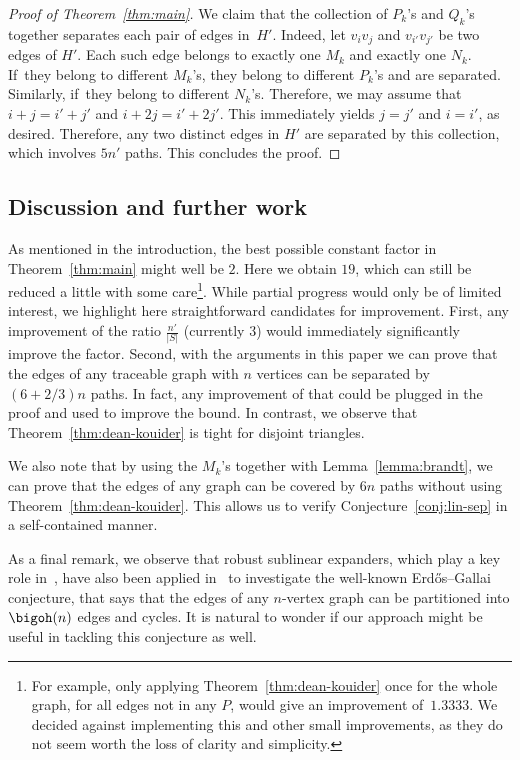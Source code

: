 \begin{proof}[Proof of Theorem~\ref{thm:main}]
We claim that the collection of $P_k$'s and $Q_k$'s
together separates each pair of edges in~\(H'\).
Indeed, let $v_iv_j$ and $v_{i'}v_{j'}$ be two edges of \(H'\).
Each such edge belongs to exactly one $M_k$ and exactly one $N_k$.
If~they belong to different \(M_k\)'s, they belong to different $P_k$'s and are separated.
Similarly, if~they belong to different $N_k$'s. Therefore, we may assume that $i+j=i'+j'$ and $i+2 j=i'+2 j'$. This immediately yields $j=j'$ and $i=i'$,
as desired. Therefore, any two distinct edges in $H'$ are separated by this collection, which involves $5n'$ paths.
This concludes the proof.
\end{proof}

\subsection*{Discussion and further work}
As mentioned in the introduction, the best possible constant factor in Theorem~\ref{thm:main} might well be $2$. Here we obtain $19$, which can still be reduced a little with some care\footnote{For example, only applying Theorem~\ref{thm:dean-kouider} once for the whole graph, for all edges not in any $P$, would give an improvement of~$1.3333$. We decided against implementing this and other small improvements, as they do not seem worth the loss of clarity and simplicity.
}. While partial progress would only be of limited interest, we highlight here straightforward candidates for improvement. First, any improvement of the ratio $\frac{n'}{|S|}$ (currently $3$) would immediately significantly improve the factor. Second, with the arguments in this paper we can prove that the edges of any traceable graph with \(n\) vertices can be separated by \((6+2/3)n\) paths. In fact, any improvement of that could be plugged in the proof and used to improve the bound.
In contrast, we observe that Theorem~\ref{thm:dean-kouider} is tight for disjoint triangles.


We also note that by using the \(M_k\)'s together with Lemma~\ref{lemma:brandt}, we can prove that the edges of any graph can be covered by \(6n\) paths without using Theorem~\ref{thm:dean-kouider}. This allows us to verify Conjecture~\ref{conj:lin-sep}
in a self-contained manner.

  As a final remark, we observe that robust sublinear expanders,
which play a key role in~\cite{letzter2022separating}, have also
been applied in~\cite{bucic2022towards} to investigate the well-known Erd\H os--Gallai
conjecture, that says that the edges of any $n$-vertex graph can
be partitioned into $\bigoh(n) $ edges and
cycles. It is natural to wonder if our
approach might be useful in tackling this conjecture as well.



